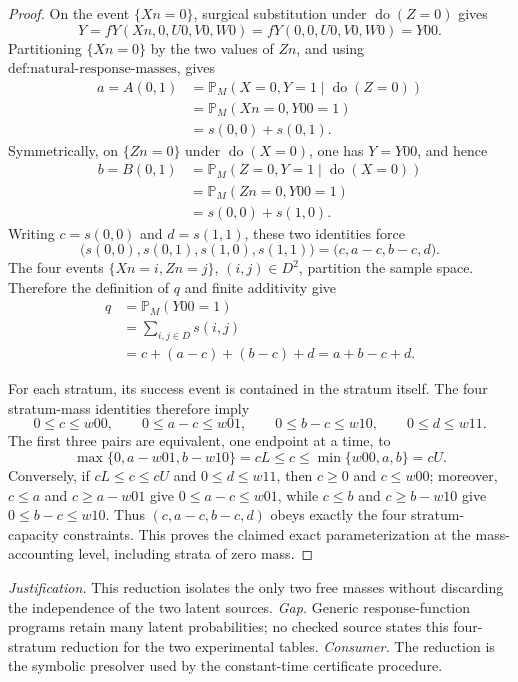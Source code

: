 \documentclass{article}
\begin{document}
\begin{proof}
On the event \(\{Xn=0\}\), surgical substitution under \(\operatorname{do}(Z=0)\) gives
\[
Y=fY(Xn,0,U0,V0,W0)=fY(0,0,U0,V0,W0)=Y00.
\]
Partitioning \(\{Xn=0\}\) by the two values of \(Zn\), and using \(\text{def:natural-response-masses}\), gives
\[
\begin{aligned}
a=A(0,1)
&=\mathbb P_M(X=0,Y=1\mid\operatorname{do}(Z=0))\\
&=\mathbb P_M(Xn=0,Y00=1)\\
&=s(0,0)+s(0,1).
\end{aligned}
\]
Symmetrically, on \(\{Zn=0\}\) under \(\operatorname{do}(X=0)\), one has \(Y=Y00\), and hence
\[
\begin{aligned}
b=B(0,1)
&=\mathbb P_M(Z=0,Y=1\mid\operatorname{do}(X=0))\\
&=\mathbb P_M(Zn=0,Y00=1)\\
&=s(0,0)+s(1,0).
\end{aligned}
\]
Writing \(c=s(0,0)\) and \(d=s(1,1)\), these two identities force
\[
\bigl(s(0,0),s(0,1),s(1,0),s(1,1)\bigr)
=\bigl(c,a-c,b-c,d\bigr).
\]
The four events \(\{Xn=i,Zn=j\}\), \((i,j)\in D^2\), partition the sample space.  Therefore the definition of \(q\) and finite additivity give
\[
\begin{aligned}
q
&=\mathbb P_M(Y00=1)\\
&=\sum_{i,j\in D}s(i,j)\\
&=c+(a-c)+(b-c)+d=a+b-c+d.
\end{aligned}
\]

For each stratum, its success event is contained in the stratum itself.  The four stratum-mass identities therefore imply
\[
0\le c\le w00,\qquad
0\le a-c\le w01,\qquad
0\le b-c\le w10,\qquad
0\le d\le w11.
\]
The first three pairs are equivalent, one endpoint at a time, to
\[
\max\{0,a-w01,b-w10\}=cL
\le c\le
\min\{w00,a,b\}=cU.
\]
Conversely, if \(cL\le c\le cU\) and \(0\le d\le w11\), then \(c\ge0\) and \(c\le w00\); moreover, \(c\le a\) and \(c\ge a-w01\) give \(0\le a-c\le w01\), while \(c\le b\) and \(c\ge b-w10\) give \(0\le b-c\le w10\).  Thus \((c,a-c,b-c,d)\) obeys exactly the four stratum-capacity constraints.  This proves the claimed exact parameterization at the mass-accounting level, including strata of zero mass.
\end{proof}
\par\smallskip\noindent \textit{Justification.} This reduction isolates the only two free masses without discarding the independence of the two latent sources. \textit{Gap.} Generic response-function programs retain many latent probabilities; no checked source states this four-stratum reduction for the two experimental tables. \textit{Consumer.} The reduction is the symbolic presolver used by the constant-time certificate procedure.
\end{document}
